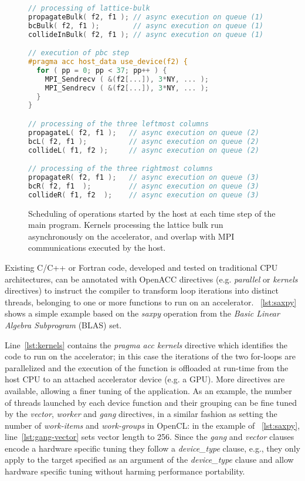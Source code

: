 \documentclass[times]{cpeauth}
\begin{document}
%
\begin{figure}[t]
\centering
\begin{lstlisting}[language=C,basicstyle=\footnotesize]
// processing of lattice-bulk
propagateBulk( f2, f1 ); // async execution on queue (1)
bcBulk( f2, f1 );        // async execution on queue (1)         
collideInBulk( f2, f1 ); // async execution on queue (1)

// execution of pbc step
#pragma acc host_data use_device(f2) {
  for ( pp = 0; pp < 37; pp++ ) {
    MPI_Sendrecv ( &(f2[...]), 3*NY, ... );
    MPI_Sendrecv ( &(f2[...]), 3*NY, ... );
  } 
}

// processing of the three leftmost columns
propagateL( f2, f1 );   // async execution on queue (2)
bcL( f2, f1 );          // async execution on queue (2)  
collideL( f1, f2 );     // async execution on queue (2)

// processing of the three rightmost columns
propagateR( f2, f1 );   // async execution on queue (3)
bcR( f2, f1  );         // async execution on queue (3)  
collideR( f1, f2  );    // async execution on queue (3)
\end{lstlisting}
\caption{Scheduling of operations started by the host at each time 
step of the main program. Kernels processing the lattice bulk run  
asynchronously on the accelerator, and overlap with MPI communications executed by the host.}
\label{fig:schedulingop}
\end{figure}
%

Existing C/C++ or Fortran code, developed and tested on traditional
CPU architectures, can be annotated with OpenACC directives (e.g. 
\textit{parallel} or \textit{kernels} directives) to instruct the compiler to 
transform loop iterations into distinct threads, belonging to one or more 
functions to run on an accelerator. \figurename~\ref{lst:saxpy} shows a simple example
based on the \textit{saxpy} operation from the {\em Basic Linear Algebra Subprogram} (BLAS) set.

Line~\ref{lst:kernels} contains the \textit{pragma acc kernels} directive 
which identifies the code to run on the accelerator; in this case the 
iterations of the two for-loops are parallelized and the execution of the function is offloaded 
at run-time from the host CPU to an attached accelerator device (e.g. a GPU). 
%
More directives are available, allowing a finer tuning of the application.
As an example, the number of threads launched by each device function and
their grouping can be fine tuned by the \textit{vector}, \textit{worker} and
\textit{gang} directives, in a similar fashion as setting the number of
\textit{work-items} and \textit{work-groups} in OpenCL: in the example of
\figurename~\ref{lst:saxpy}, line~\ref{lst:gang-vector} sets vector length to 256.
Since the \textit{gang} and \textit{vector} clauses encode a hardware specific tuning
they follow a \textit{device\_type} clause, e.g., they only apply to the
target specified as an argument of the \textit{device\_type} clause and allow 
hardware specific tuning without harming performance portability.
\end{document}

